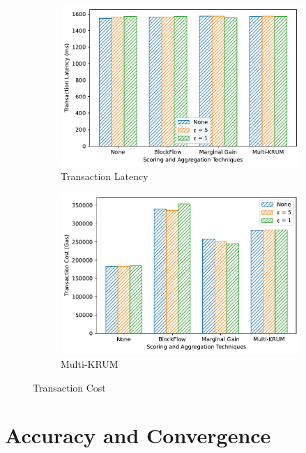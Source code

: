 \begin{figure}[!ht]
\begin{subfigure}[b]{0.49\textwidth}
        \centering
        \includegraphics[width=\textwidth]{graphics/05_priv_tx_latency.pdf}
        \caption{Transaction Latency}
    \end{subfigure}
    \hfill
    \begin{subfigure}[b]{0.49\textwidth}
        \centering
        \includegraphics[width=\textwidth]{graphics/05_priv_tx_cost.pdf}
        \caption{Multi-KRUM}
    \end{subfigure}
    \caption{Transaction Cost}
    \label{fig:priv_metrics}
\end{figure}

\section{Accuracy and Convergence}

